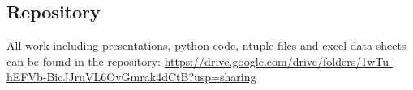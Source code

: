 \documentclass[a4paper]{article}
\newcommand{\detailtexcount}[1]{%
  \immediate\write18{texcount -merge -sum -q #1.tex output.bbl > #1.wcdetail }%
}
\newcommand{\quickwordcount}[1]{%
  \immediate\write18{texcount -1 -sum -merge -q #1.tex output.bbl > #1-words.sum }%
   words%
}
\newcommand{\quickcharcount}[1]{%
  \immediate\write18{texcount -1 -sum -merge -char -q #1.tex output.bbl > #1-chars.sum }%
   characters (not including spaces)%
}
\begin{document}
\begin{appendix}
    \section{Repository}
    All work including presentations, python code, ntuple files and excel data sheets can be found in the repository: \url{https://drive.google.com/drive/folders/1wTu-hEFVb-BicJJruVL6OvGmrak4dCtB?usp=sharing}
\end{appendix}
\newpage
\end{document}
